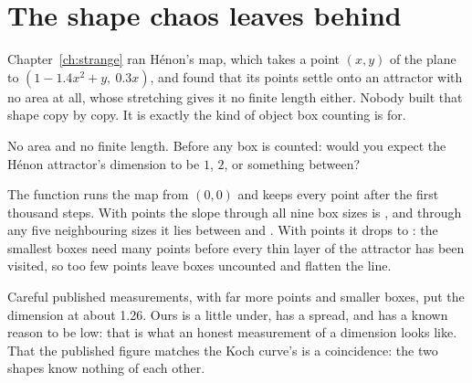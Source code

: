 \section{The shape chaos leaves behind}
\label{sec:ch11-henon}

\noindent
Chapter~\ref{ch:strange} ran Hénon's map, which takes a point $(x, y)$ of the
plane to $(1 - \num{1.4}x^{2} + y,\ \num{0.3}x)$, and found that its points
settle onto an attractor with no area at all, whose stretching gives it no
finite length either. Nobody built that shape copy by copy. It is exactly
the kind of object box counting is for.

\begin{think}
No area and no finite length. Before any box is counted: would you expect the
Hénon attractor's dimension to be $1$, $2$, or something between?
\end{think}



\noindent
The function  runs the map from $(0, 0)$ and keeps every
point after the first thousand steps. With
 points the slope through all nine box sizes is
, and through any five neighbouring sizes it lies between
 and . With
 points it drops to : the
smallest boxes need many points before every thin layer of the attractor
has been visited, so too few points leave boxes uncounted and flatten the
line.

Careful published measurements, with far more points and smaller boxes, put
the dimension at about \num{1.26}. Ours is a little under, has a spread, and
has a known reason to be low: that is what an honest measurement of a
dimension looks like. That the published figure matches the Koch curve's is
a coincidence: the two shapes know nothing of each other.



